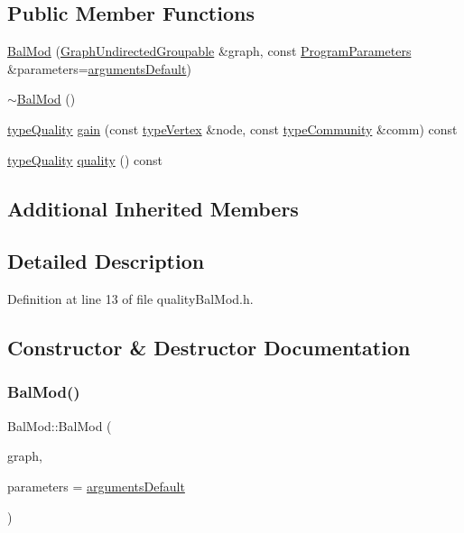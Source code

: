 \subsection*{Public Member Functions}
\begin{DoxyCompactItemize}
\item 
\hyperlink{classBalMod_a2ee470cf988234b0fe44877346455761}{Bal\+Mod} (\hyperlink{classGraphUndirectedGroupable}{Graph\+Undirected\+Groupable} \&graph, const \hyperlink{structProgramParameters}{Program\+Parameters} \&parameters=\hyperlink{program_8h_ae2d819404495f80f31db7676c1329d19}{arguments\+Default})
\item 
\hyperlink{classBalMod_a73c75118b324e532c821d5d7fdc8cc44}{$\sim$\+Bal\+Mod} ()
\item 
\hyperlink{qualityInterface_8h_a15a3ec6041e6e02d00d2eff22c20fd94}{type\+Quality} \hyperlink{classBalMod_a5e65ffa1b97d2455a552ed98cb003bcc}{gain} (const \hyperlink{edge_8h_a5fbd20c46956d479cb10afc9855223f6}{type\+Vertex} \&node, const \hyperlink{graphUndirectedGroupable_8h_a914da95c9ea7f14f4b7f875c36818556}{type\+Community} \&comm) const
\item 
\hyperlink{qualityInterface_8h_a15a3ec6041e6e02d00d2eff22c20fd94}{type\+Quality} \hyperlink{classBalMod_a5cfc9f2446c0734496440aa7fcfc2a9a}{quality} () const
\end{DoxyCompactItemize}
\subsection*{Additional Inherited Members}


\subsection{Detailed Description}


Definition at line 13 of file quality\+Bal\+Mod.\+h.



\subsection{Constructor \& Destructor Documentation}
\mbox{\label{classBalMod_a2ee470cf988234b0fe44877346455761}} 
\subsubsection{\texorpdfstring{Bal\+Mod()}{BalMod()}}
{\footnotesize\ttfamily Bal\+Mod\+::\+Bal\+Mod (\begin{DoxyParamCaption}\item[{\hyperlink{classGraphUndirectedGroupable}{Graph\+Undirected\+Groupable} \&}]{graph,  }\item[{const \hyperlink{structProgramParameters}{Program\+Parameters} \&}]{parameters = {\ttfamily \hyperlink{program_8h_ae2d819404495f80f31db7676c1329d19}{arguments\+Default}} }\end{DoxyParamCaption})\hspace{0.3cm}{\ttfamily [inline]}}



